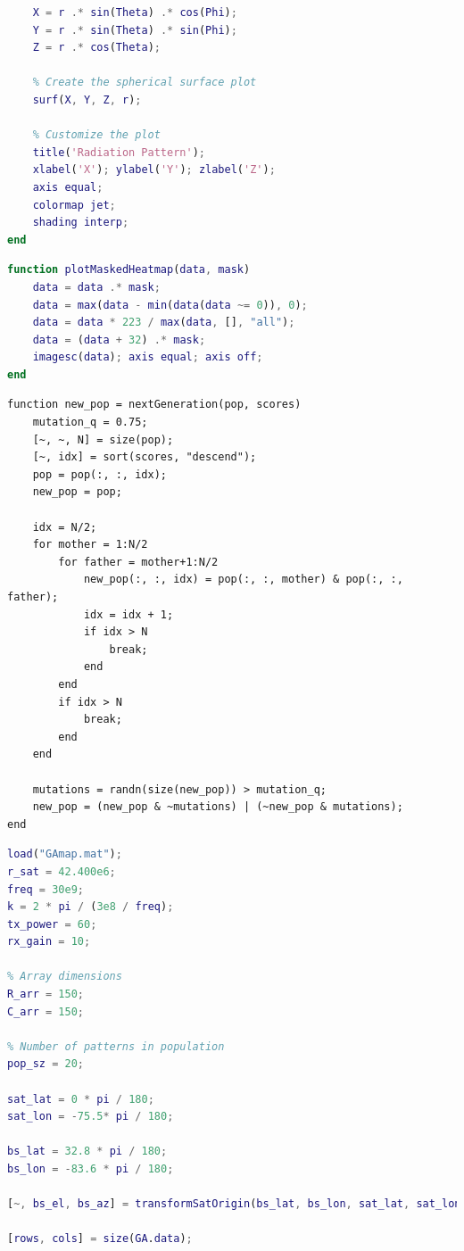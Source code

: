 \documentclass[12pt]{article}
\begin{document}
\begin{enumerate}
\begin{lstlisting}[language=matlab]
    % Convert spherical to Cartesian coordinates
    X = r .* sin(Theta) .* cos(Phi);
    Y = r .* sin(Theta) .* sin(Phi);
    Z = r .* cos(Theta);
    
    % Create the spherical surface plot
    surf(X, Y, Z, r);
    
    % Customize the plot
    title('Radiation Pattern');
    xlabel('X'); ylabel('Y'); zlabel('Z');
    axis equal;
    colormap jet;
    shading interp;
end
    \end{lstlisting}

    \begin{lstlisting}[language=matlab]
function plotMaskedHeatmap(data, mask)
    data = data .* mask;
    data = max(data - min(data(data ~= 0)), 0);
    data = data * 223 / max(data, [], "all");
    data = (data + 32) .* mask;
    imagesc(data); axis equal; axis off;
end
    \end{lstlisting}

    \begin{lstlisting}
function new_pop = nextGeneration(pop, scores)
    mutation_q = 0.75;
    [~, ~, N] = size(pop);
    [~, idx] = sort(scores, "descend");
    pop = pop(:, :, idx);
    new_pop = pop;
    
    idx = N/2;
    for mother = 1:N/2
        for father = mother+1:N/2
            new_pop(:, :, idx) = pop(:, :, mother) & pop(:, :, father);
            idx = idx + 1;
            if idx > N
                break;
            end
        end
        if idx > N
            break;
        end
    end

    mutations = randn(size(new_pop)) > mutation_q;
    new_pop = (new_pop & ~mutations) | (~new_pop & mutations);
end
    \end{lstlisting}

    \begin{lstlisting}[language=matlab]
load("GAmap.mat");
r_sat = 42.400e6;
freq = 30e9;
k = 2 * pi / (3e8 / freq);
tx_power = 60;
rx_gain = 10;

% Array dimensions
R_arr = 150;
C_arr = 150;

% Number of patterns in population
pop_sz = 20;

sat_lat = 0 * pi / 180;
sat_lon = -75.5* pi / 180;

bs_lat = 32.8 * pi / 180;
bs_lon = -83.6 * pi / 180;

[~, bs_el, bs_az] = transformSatOrigin(bs_lat, bs_lon, sat_lat, sat_lon, r_sat);

[rows, cols] = size(GA.data);


\end{lstlisting}
\end{enumerate}
\end{document}
